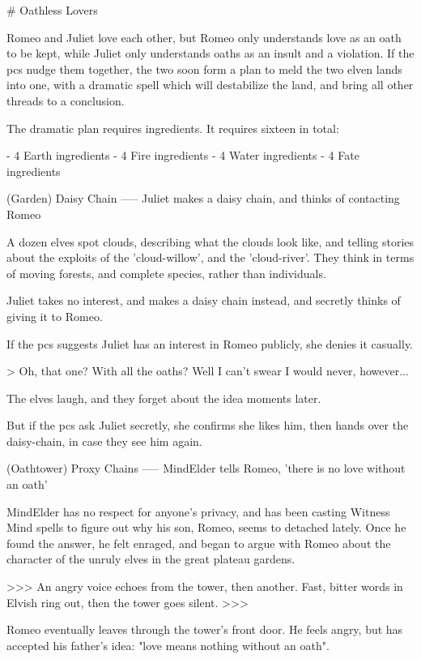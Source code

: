 # Oathless Lovers

Romeo and Juliet love each other, but Romeo only understands love as an oath to be kept, while Juliet only understands oaths as an insult and a violation.
If the \glspl{pc} nudge them together, the two soon form a plan to meld the two elven lands into one, with a dramatic spell which will destabilize the land, and bring all other threads to a conclusion.

The dramatic plan
requires \glspl{ingredient}.
It requires sixteen in total:

- 4 Earth \glspl{ingredient}
- 4 Fire \glspl{ingredient}
- 4 Water \glspl{ingredient}
- 4 Fate \glspl{ingredient}

(Garden) Daisy Chain
-----
{Juliet makes a daisy chain, and thinks of contacting Romeo}

A dozen elves spot clouds, describing what the clouds look like, and telling stories about the exploits of the 'cloud-willow', and the 'cloud-river'.
They think in terms of moving forests, and complete species, rather than individuals.

Juliet takes no interest, and makes a daisy chain instead, and secretly thinks of giving it to Romeo.

If the \glspl{pc} suggests Juliet has an interest in Romeo publicly,
she denies it casually.

> Oh, that one?  With all the oaths?  Well I can't swear I would never, however...

The elves laugh, and they forget about the idea moments later.

But if the \glspl{pc} ask Juliet secretly,
she confirms she likes him, then hands over the daisy-chain, in case they see him again.

(Oathtower) Proxy Chains
-----
{MindElder tells Romeo, 'there is no love without an oath'}

\Gls{MindElder} has no respect for anyone's privacy, and has been casting Witness Mind spells to figure out why his son, Romeo, seems to detached lately.
Once he found the answer, he felt enraged, and began to argue with Romeo about the character of the unruly elves in the great plateau gardens.

>>>
An angry voice echoes from the tower, then another.
Fast, bitter words in Elvish ring out, then the tower goes silent.
>>>

Romeo eventually leaves through the tower's front door.
He feels angry, but has accepted his father's idea: "love means nothing without an oath".

